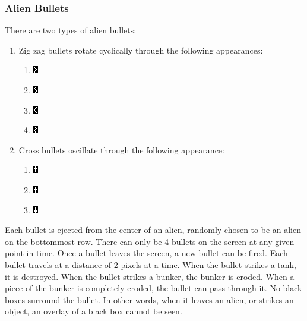 \documentclass[11pt,letter,oneside]{report}
\begin{document}
\subsubsection{Alien Bullets}
There are two types of alien bullets:
\begin{enumerate}
\item{}  Zig zag bullets rotate cyclically through the following appearances:

\begin{enumerate}
\item 
 \includegraphics[scale=2]{ZigBullet0.png}
\item 
 \includegraphics[scale=2]{ZigBullet1.png}
\item
 \includegraphics[scale=2]{ZigBullet2.png}
\item
 \includegraphics[scale=2]{ZigBullet3.png}
\end{enumerate}

\item{}  Cross bullets oscillate through the following appearance:

\begin{enumerate}
\item
 \includegraphics[scale=2]{TBullet0.png}
\item
 \includegraphics[scale=2]{TBullet1.png}
\item
 \includegraphics[scale=2]{TBullet2.png}
\end{enumerate}

\end{enumerate}

Each bullet is ejected from the center of an alien, randomly chosen to be an alien on the bottommost row. There can only be 4 bullets on the screen at any given point in time.  Once a bullet leaves the screen, a new bullet can be fired. Each bullet travels at a distance of 2 pixels at a time. When the bullet strikes a tank, it is destroyed. When the bullet strikes a bunker, the bunker is eroded. When a piece of the bunker is completely eroded, the bullet can pass through it.  No black boxes surround the bullet. In other words, when it leaves an alien, or strikes an object, an overlay of a black box cannot be seen. 
\end{document}
